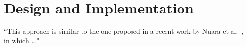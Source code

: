 \chapter{Design and Implementation}
\label{ch:design}

``This approach is similar to the one proposed in a recent work by Nuara et al.~\cite{nuara2020driving}, in which ..."